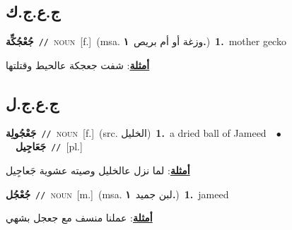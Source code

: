 \documentclass[10pt,a4paper,twoside]{article} %
\begin{document}
\begin{multicols}{2}
\vspace{-3mm}
\subsection*{\color{blue}\foreignlanguage{arabic}{ج.ع.ج.ك}\color{blue}{}} 

{\setlength\topsep{0pt}\textbf{\foreignlanguage{arabic}{جُعْجُكِّة}}\ {\color{gray}\texttt{//}\color{black}}\ \textsc{noun}\ [f.]\ \color{gray}(msa. \foreignlanguage{arabic}{وزغة أو أم بريص}~\foreignlanguage{arabic}{\textbf{١.}})\color{black}\ \textbf{1.}~mother gecko\  \begin{flushright}\color{gray}\foreignlanguage{arabic}{\textbf{\underline{\foreignlanguage{arabic}{أمثلة}}}: شفت جعجكة عالحيط وقتلتها}\end{flushright}\color{black}} \vspace{2mm}

\vspace{-3mm}
\subsection*{\color{blue}\foreignlanguage{arabic}{ج.ع.ج.ل}\color{blue}{}} 

{\setlength\topsep{0pt}\textbf{\foreignlanguage{arabic}{جَعْجُولِة}}\ {\color{gray}\texttt{//}\color{black}}\ \textsc{noun}\ [f.]\ (src. \color{gray}\foreignlanguage{arabic}{الخليل}\color{black})\ \textbf{1.}~a dried ball of Jameed\ \ $\bullet$\ \ \setlength\topsep{0pt}\textbf{\foreignlanguage{arabic}{جَعَاجِيل}}\ {\color{gray}\texttt{//}\color{black}}\ [pl.]\  \begin{flushright}\color{gray}\foreignlanguage{arabic}{\textbf{\underline{\foreignlanguage{arabic}{أمثلة}}}: لما نزل عالخليل وصيته عشوية جَعاجِيل}\end{flushright}\color{black}} \vspace{2mm}

{\setlength\topsep{0pt}\textbf{\foreignlanguage{arabic}{جُعْجُل}}\ {\color{gray}\texttt{//}\color{black}}\ \textsc{noun}\ [m.]\ \color{gray}(msa. \foreignlanguage{arabic}{لبن جميد}~\foreignlanguage{arabic}{\textbf{١.}})\color{black}\ \textbf{1.}~jameed\  \begin{flushright}\color{gray}\foreignlanguage{arabic}{\textbf{\underline{\foreignlanguage{arabic}{أمثلة}}}: عملنا منسف مع جعجل بشهي}\end{flushright}\color{black}} \vspace{2mm}


\end{multicols}
\end{document}
